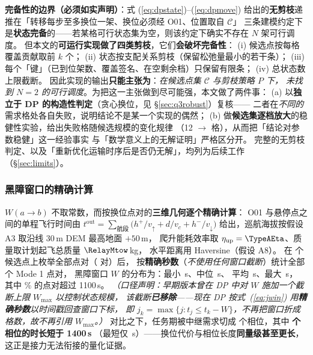 \documentclass[12pt,a4paper,fontset=windows]{ctexart}
\begin{document}
\noindent\textbf{完备性的边界（必须如实声明）}：式 (\ref{eq:dpstate})--(\ref{eq:dpmove})
给出的\textbf{无剪枝}递推在「转移每步至多换位一架、换位必须经 O01、位置取自 $\mathcal{C}$」
三条建模约定下是\textbf{状态完备}的——若某格可行状态集为空，则该约定下确实不存在 $N$ 架可行调度。
但本文的\textbf{可运行实现做了四类剪枝}，它们\textbf{会破坏完备性}：
(i) 候选点按每格覆盖贡献取前 $k$ 个；
(ii) 状态按支配关系剪枝（保留松弛量最小的若干条）；
(iii) 每个「键」（已到位架数、覆盖签名、在空剩余档）只保留有限条；
(iv) 总状态数上限截断。
因此实现的输出\textbf{只能主张为}：\emph{在候选点集 $\mathcal{C}$ 与剪枝策略 $P$ 下，
未找到 $N=2$ 的可行调度}。为把这一主张做到尽可能强，本文做了两件事：
(a) 以\textbf{独立于 DP 的构造性判定}（贪心换位，见 \S\ref{sec:q3robust}）复核——
二者在\emph{不同的}需求格处各自失败，说明结论不是某一个实现的偶然；
(b) 做\textbf{候选集逐档放大}的稳健性实验，给出失败格随候选规模的变化规律
（12 $\to$ \QthreeFailCellHigh{} 格），从而把「结论对参数稳健」这一经验事实
与「数学意义上的无解证明」严格区分开。
完整的无剪枝判定、以及「重新优化运输时序后是否仍无解」，均列为后续工作（\S\ref{sec:limits}）。

\subsubsection{黑障窗口的精确计算}
$W(a\!\to\!b)$ 不取常数，而按换位点对的\textbf{三维几何逐个精确计算}：
O01 与悬停点之间的单程飞行时间由
$t^{\mathrm{out}}=\sum_{\text{航段}}\big(h^{+}/v_{\uparrow}+d/v_c+h^{-}/v_{\downarrow}\big)$
给出，巡航海拔按假设 A3 取沿线 30\,m DEM 最高地面 $+50$\,m，
爬升能耗效率取 $\eta_{\mathrm{up}}=\TypeAEta$、质量取计划起飞总质量 $\RelayMtow$\,kg，
水平距离用 Haversine（假设 A8）。
在 \QthreeDpCandPts{} 个候选点上枚举全部点对（\QthreeDpCandPairs{} 对）后，
按\textbf{精确秒数}（\emph{不使用任何窗口截断}）统计全部 \QthreeDpBlackoutPairs{} 个 Mode 1 点对，
黑障窗口 $W$ 的分布为：最小 \QthreeDpBlackoutMinS\,s、中位 \QthreeDpBlackoutMedianS\,s、
平均 \QthreeDpBlackoutMeanS\,s、最大 \QthreeDpBlackoutMaxS\,s，
其中 \QthreeDpBlackoutGePct\% 的点对超过 1100\,s。
\emph{（口径声明：早期版本曾在 DP 中对 $W$ 施加一个截断上限 $W_{\max}$ 以控制状态规模，
该截断\textbf{已移除}——现在 DP 按式~(\ref{eq:jwin}) 用\textbf{精确秒数}以时间戳回查窗口下标，
即 $j_k=\max\{j:t_j\le t_k-W\}$，不再把窗口折成格数，故不再引用 $W_{\max}$。）}
对比之下，任务期被中继需求切成 \QthreeDpPhases{} 个相位，其中\textbf{\QthreeDpShortPhases{} 个相位的时长短于 1400\,s}
（最短仅 \QthreeDpShortPhaseMinS\,s）——换位代价与相位长度\textbf{同量级甚至更长}，
这正是接力无法衔接的量化证据。
\end{document}
